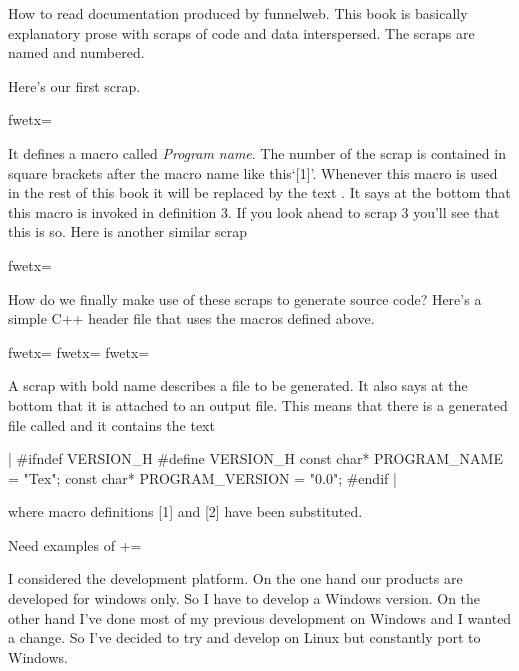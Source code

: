 How to read documentation produced by funnelweb. This book is
basically explanatory prose with scraps of code and data
interspersed. The scraps are named and numbered.

Here's our first scrap.

\fwbeginmacro
{}\fwequals \fwodef \fwbtx[TeX]fwetx=%
\fwcdef 
\fwbeginmacronotes
{}
\fwendmacronotes
\fwendmacro


It defines a macro called {\it Program name}. The number of the scrap
is contained in square brackets after the macro name like this`[1]'.
Whenever this macro is used in the rest of this book it will be
replaced by the text . It says at the bottom that this macro
is invoked in definition 3. If you look ahead to scrap 3 you'll see that
this is so. Here is another similar scrap

\fwbeginmacro
{}\fwequals \fwodef \fwbtx[0.0]fwetx=%
\fwcdef 
\fwbeginmacronotes
{}
\fwendmacronotes
\fwendmacro


How do we finally make use of these scraps to generate source code?
Here's a simple C++ header file that uses the macros defined above.

\fwbeginmacro
{}\fwequals \fwodef \fwbtx[#ifndef VERSION_H
#define VERSION_H
const char* PROGRAM_NAME = "]fwetx=%
\fwbtx[";
const char* PROGRAM_VERSION = "]fwetx=%
\fwbtx[";
#endif
]fwetx=%
\fwcdef 
\fwbeginmacronotes
{}
\fwendmacronotes
\fwendmacro


A scrap with bold name describes a file to be generated. It also
says at the bottom that it is attached to an output file. This means
that there is a generated file called  and it contains
the text

\beginlines|
#ifndef VERSION_H
#define VERSION_H
const char* PROGRAM_NAME = "Tex";
const char* PROGRAM_VERSION = "0.0";
#endif
|\endlines

where macro definitions [1] and [2] have been substituted.

Need examples of  +=




I considered the development platform. On the one hand our products are
developed for windows only. So I have to develop a Windows version. On
the other hand I've done most of my previous development on Windows and
I wanted a change. So I've decided to try and develop on Linux but
constantly port to Windows.

